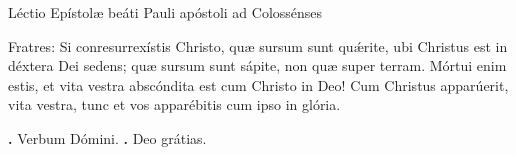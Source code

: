 
Léctio Epístolæ beáti Pauli apóstoli
ad Colossénses

Fratres:
Si conresurrexístis Christo, quæ sursum sunt qu\'{\ae}rite, ubi Christus est in déxtera Dei sedens; quæ sursum sunt sápite, non quæ super terram.
Mórtui enim estis, et vita vestra abscóndita est cum Christo in Deo!
Cum Christus apparúerit, vita vestra, tunc et vos apparébitis cum ipso in glória.

\textbf{\Vbar.} Verbum Dómini.
\textbf{\Rbar.} Deo grátias.
\par